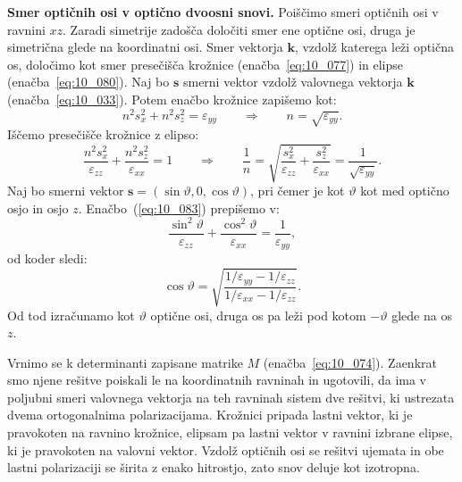 \begin{example}{\bf Smer optičnih osi v optično dvoosni snovi.}
Poiščimo smeri optičnih osi v ravnini $xz$. Zaradi simetrije zadošča določiti smer 
ene optične osi, druga je simetrična glede na koordinatni osi. 
Smer vektorja $\mathbf{k}$, vzdolž katerega leži optična os, 
določimo kot smer presečišča krožnice (enačba~\ref{eq:10_077}) in elipse (enačba~\ref{eq:10_080}). 
Naj bo $\mathbf{s}$ smerni vektor vzdolž valovnega vektorja $\mathbf{k}$ (enačba~\ref{eq:10_033}).
Potem enačbo krožnice zapišemo kot:
\begin{equation}
n^2s_x^2+n^2s_z^2 = \varepsilon_{yy} \qquad \Longrightarrow \qquad n = \sqrt{\varepsilon_{yy}}.
\label{eq:10_081}
\end{equation}
Iščemo presečišče krožnice z elipso:
\begin{equation}
\frac{n^2s_x^2}{\varepsilon_{zz}} + \frac{n^2s_z^2}{\varepsilon_{xx}}=1 \qquad \Longrightarrow \qquad 
\frac{1}{n} = \sqrt{\frac{s_x^2}{\varepsilon_{zz}} + \frac{s_z^2}{\varepsilon_{xx}}} = 
\frac{1}{\sqrt{\varepsilon_{yy}}}.
\label{eq:10_083}
\end{equation}
Naj bo smerni vektor $\mathbf{s}= (\sin\vartheta, 0, \cos\vartheta)$, pri čemer je kot
$\vartheta$ kot med optično osjo in osjo $z$. Enačbo~(\ref{eq:10_083}) prepišemo
v:
\begin{equation}
\frac{\sin^2\vartheta}{\varepsilon_{zz}} + \frac{\cos^2\vartheta}{\varepsilon_{xx}}=
\frac{1}{\varepsilon_{yy}},
\label{eq:10_085}
\end{equation}
od koder sledi:
\begin{equation}
\cos \vartheta = \sqrt{\frac{1/\varepsilon_{yy}-1/\varepsilon_{zz}}{1/\varepsilon_{xx}-1/\varepsilon_{zz}}}.
\label{eq:10_086}
\end{equation}
Od tod izračunamo kot $\vartheta$ optične osi, druga os pa leži pod kotom $-\vartheta$ glede na os $z$.
\end{example}

Vrnimo se k determinanti zapisane matrike $M$ (enačba~\ref{eq:10_074}). Zaenkrat smo njene 
rešitve poiskali le na koordinatnih ravninah in ugotovili, da ima v poljubni smeri valovnega vektorja
na teh ravninah sistem dve rešitvi, ki ustrezata dvema ortogonalnima polarizacijama. Krožnici
pripada lastni vektor, ki je pravokoten na ravnino krožnice, elipsam pa lastni vektor v ravnini 
izbrane elipse, ki je pravokoten na valovni vektor. Vzdolž optičnih osi se rešitvi ujemata in 
obe lastni polarizaciji se širita z enako hitrostjo, zato snov deluje kot izotropna. 

